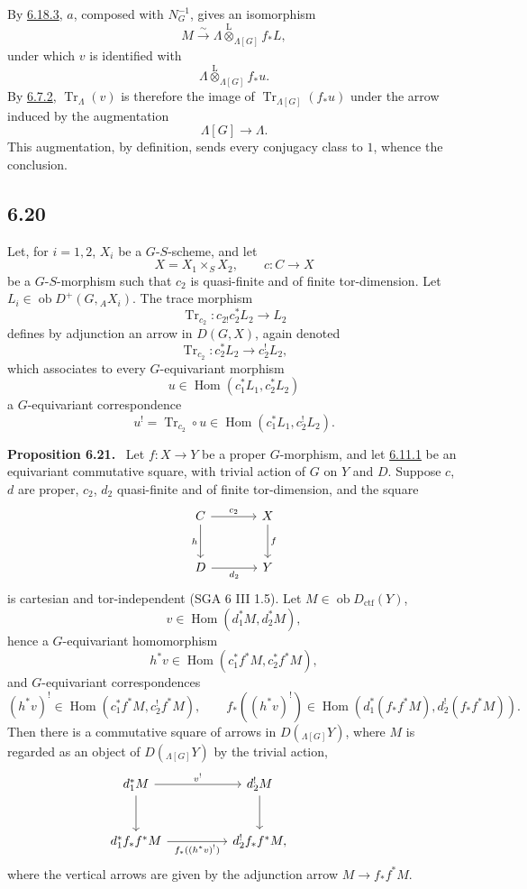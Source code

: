 \documentclass[11pt]{article}
\newenvironment{statement}[1]{\par\medskip\noindent\textbf{#1.}\ }{\par\medskip}
\DeclareMathOperator{\Hom}{Hom}
\providecommand{\Tr}{\operatorname{Tr}}
\providecommand{\Tr}{\operatorname{Tr}}
\providecommand{\lten}{\overset{\mathrm L}{\otimes}}
\providecommand{\Ob}{\operatorname{ob}}
\providecommand{\Tr}{\operatorname{Tr}}
\providecommand{\Hom}{\operatorname{Hom}}
\providecommand{\lten}{\overset{\mathrm L}{\otimes}}
\providecommand{\lten}{\overset{\mathrm L}{\otimes}}
\providecommand{\Ob}{\operatorname{ob}}
\providecommand{\Tr}{\operatorname{Tr}}
\providecommand{\lten}{\overset{\mathrm L}{\otimes}}
\providecommand{\lten}{\overset{\mathrm L}{\otimes}}
\providecommand{\Ob}{\operatorname{Ob}}
\providecommand{\lten}{\overset{\mathrm L}{\otimes}}
\providecommand{\Hom}{\operatorname{Hom}}
\providecommand{\Tr}{\operatorname{Tr}}
\providecommand{\Ob}{\operatorname{ob}}
\providecommand{\Ob}{\operatorname{Ob}}
\providecommand{\lten}{\overset{\mathrm L}{\otimes}}
\begin{document}
By \hyperref[sga5:IIIB:lemma:6.18.3]{6.18.3}, $a$, composed with $N_G^{-1}$, gives an isomorphism
\[
M\xrightarrow{\sim}\Lambda\lten_{\Lambda[G]}f_*L,
\]
under which $v$ is identified with
\[
\Lambda\lten_{\Lambda[G]}f_*u.
\]
By \hyperref[sga5:IIIB:equation:6.7.2]{6.7.2}, $\Tr_{\Lambda}(v)$ is therefore the image of $\Tr_{\Lambda[G]}(f_*u)$ under the arrow induced by the augmentation
\[
\Lambda[G]\longrightarrow \Lambda.
\]
This augmentation, by definition, sends every conjugacy class to $1$, whence the conclusion.

\subsection*{6.20}\label{sga5:IIIB:subsection:6.20}
Let, for $i=1,2$, $X_i$ be a $G$-$S$-scheme, and let
\[
X=X_1\times_SX_2,\qquad c:C\to X
\]
be a $G$-$S$-morphism such that $c_2$ is quasi-finite and of finite tor-dimension. Let $L_i\in\Ob D^+(G,{}_AX_i)$. The trace morphism
\[
\Tr_{c_2}:c_{2!}c_2^*L_2\longrightarrow L_2
\]
defines by adjunction an arrow in $D(G,X)$, again denoted
\begin{equation}
\Tr_{c_2}:c_2^*L_2\longrightarrow c_2^!L_2,
\tag{6.20.1}\label{sga5:IIIB:equation:6.20.1}
\end{equation}
which associates to every $G$-equivariant morphism
\[
u\in\Hom(c_1^*L_1,c_2^*L_2)
\]
a $G$-equivariant correspondence
\begin{equation}
u^! = \Tr_{c_2}\circ u\in\Hom(c_1^*L_1,c_2^!L_2).
\tag{6.20.2}\label{sga5:IIIB:equation:6.20.2}
\end{equation}

\label{sga5:IIIB:proposition:6.21}\begin{statement}{Proposition 6.21}
Let $f:X\to Y$ be a proper $G$-morphism, and let \hyperref[sga5:IIIB:equation:6.11.1]{6.11.1} be an equivariant commutative square, with trivial action of $G$ on $Y$ and $D$. Suppose $c$, $d$ are proper, $c_2$, $d_2$ quasi-finite and of finite tor-dimension, and the square
\[
\begin{tikzcd}[column sep=large,row sep=large]
C \arrow[r,"c_2"] \arrow[d,"h"'] & X \arrow[d,"f"]\\
D \arrow[r,"d_2"'] & Y
\end{tikzcd}
\]
is cartesian and tor-independent (SGA 6 III 1.5). Let $M\in\Ob D_{\mathrm{ctf}}(Y)$,
\[
v\in\Hom(d_1^*M,d_2^*M),
\]
hence a $G$-equivariant homomorphism
\[
h^*v\in\Hom(c_1^*f^*M,c_2^*f^*M),
\]
and $G$-equivariant correspondences
\[
(h^*v)^!\in\Hom(c_1^*f^*M,c_2^!f^*M),
\qquad
f_*((h^*v)^!)\in\Hom(d_1^*(f_*f^*M),d_2^!(f_*f^*M)).
\]
Then there is a commutative square of arrows in $D({}_{\Lambda[G]}Y)$, where $M$ is regarded as an object of $D({}_{\Lambda[G]}Y)$ by the trivial action,
\[
\begin{tikzcd}[column sep=huge,row sep=large]
d_1^*M \arrow[r,"v^!"] \arrow[d] & d_2^!M \arrow[d] & {}\\
d_1^*f_*f^*M \arrow[r,"f_*((h^*v)^!)"'] & d_2^!f_*f^*M,
\end{tikzcd}
\]
where the vertical arrows are given by the adjunction arrow $M\to f_*f^*M$.
\end{statement}
\end{document}
